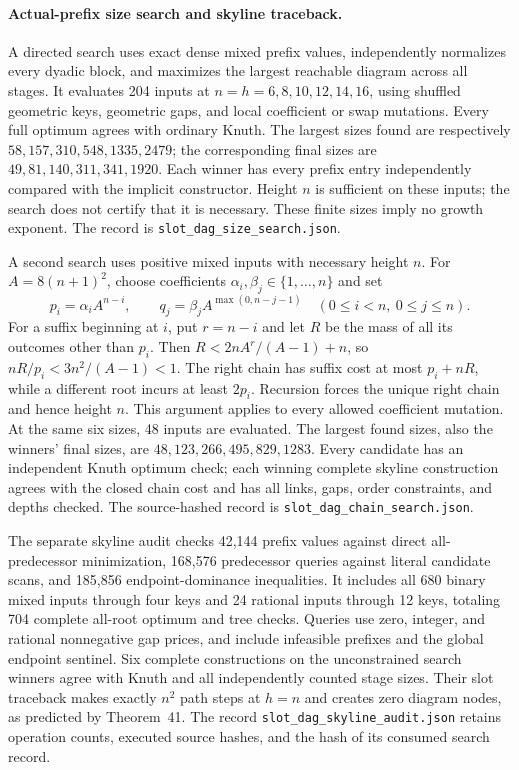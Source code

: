 \documentclass[11pt]{article}
\begin{document}
\paragraph{Actual-prefix size search and skyline traceback.}
A directed search uses exact dense mixed prefix values, independently
normalizes every dyadic block, and maximizes the largest reachable diagram
across all stages. It evaluates 204 inputs at $n=h=6,8,10,12,14,16$,
using shuffled geometric keys, geometric gaps, and local coefficient or
swap mutations. Every full optimum agrees with ordinary Knuth. The
largest sizes found are respectively $58,157,310,548,1335,2479$;
the corresponding final sizes are $49,81,140,311,341,1920$. Each winner
has every prefix entry independently compared with the implicit constructor.
Height $n$ is sufficient on these inputs; the search does not certify
that it is necessary. These finite sizes imply no growth exponent.
The record is \texttt{slot\_dag\_size\_search.json}.

A second search uses positive mixed inputs with necessary height $n$.
For $A=8(n+1)^2$, choose coefficients $\alpha_i,\beta_j\in\{1,\ldots,n\}$
and set
\[
 p_i=\alpha_i A^{n-i},\qquad
 q_j=\beta_j A^{\max(0,n-j-1)}
 \quad(0\le i<n,\ 0\le j\le n).
\]
For a suffix beginning at $i$, put $r=n-i$ and let $R$ be the mass of
all its outcomes other than $p_i$. Then
$R<2nA^r/(A-1)+n$, so
$nR/p_i<3n^2/(A-1)<1$. The right chain has suffix cost at most
$p_i+nR$, while a different root incurs at least $2p_i$.
Recursion forces the unique right chain and hence height $n$.
This argument applies to every allowed coefficient mutation.
At the same six sizes, 48 inputs are evaluated. The largest found
sizes, also the winners' final sizes, are $48,123,266,495,829,1283$.
Every candidate has an independent Knuth optimum check; each winning
complete skyline construction agrees with the closed chain cost and has
all links, gaps, order constraints, and depths checked. The source-hashed
record is \texttt{slot\_dag\_chain\_search.json}.

The separate skyline audit checks 42,144 prefix values against direct
all-predecessor minimization, 168,576 predecessor queries against literal
candidate scans, and 185,856 endpoint-dominance inequalities. It includes
all 680 binary mixed inputs through four keys and 24 rational inputs
through 12 keys, totaling 704 complete all-root optimum and tree checks.
Queries use zero, integer, and rational nonnegative gap prices, and include
infeasible prefixes and the global endpoint sentinel. Six complete
constructions on the unconstrained search winners agree with Knuth and
all independently counted stage sizes. Their slot traceback makes exactly
$n^2$ path steps at $h=n$ and creates zero diagram nodes, as predicted
by Theorem~41. The record
\texttt{slot\_dag\_skyline\_audit.json} retains operation counts, executed
source hashes, and the hash of its consumed search record.
\end{document}
